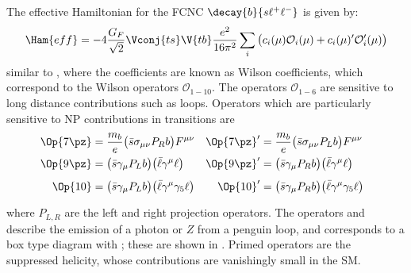 
The effective Hamiltonian for the FCNC $\decay{b}{s\ell^+\ell^-}$ is given by:
\begin{equation}
  \Ham{eff} = -4\frac{G_F}{\sqrt{2}}\Vconj{ts}\V{tb}\frac{e^2}{16\pi^2}
  \sum_{i}\big(c_i(\mu)\mathcal{O}_i(\mu)+c_i(\mu)^\prime\mathcal{O}_i^\prime(\mu)\big)
\end{equation}
similar to , where the coefficients are known as Wilson coefficients, which
correspond to the Wilson operators $\mathcal{O}_{1-10}$.
The operators $\mathcal{O}_{1-6}$ are sensitive to long distance contributions such as \ccbar
loops.
Operators which are particularly sensitive to NP contributions in  transitions are
\begin{align}
  \Op{7\pz} &= \frac{m_b}{e}\big(\bar s \sigma_{\mu\nu}P_Rb\big)F^{\mu\nu}
  &\Op{7\pz}^\prime &= \frac{m_b}{e}\big(\bar s \sigma_{\mu\nu}P_Lb\big)F^{\mu\nu}
  \nonumber\\
  \Op{9\pz} &= \big(\bar s\gamma_\mu P_Lb\big)\big(\bar\ell\gamma^\mu\ell\big)
  &\Op{9\pz}^\prime &= \big(\bar s\gamma_\mu P_Rb\big)\big(\bar\ell\gamma^\mu\ell\big)
  \nonumber\\
  \Op{10} &= \big(\bar s\gamma_\mu P_Lb\big)\big(\bar\ell\gamma^\mu\gamma_5\ell\big)
  &\Op{10}^\prime &= \big(\bar s\gamma_\mu P_Rb\big)\big(\bar\ell\gamma^\mu\gamma_5\ell\big)
  \phantom{\frac{1}{1}}
\end{align}
where $P_{L,R}$ are the left and right projection operators.
The operators  and  describe the emission of a photon or $Z$ from a penguin loop,
and  corresponds to a box type diagram with \Wp; these are shown in .
Primed operators are the suppressed helicity, whose contributions are vanishingly small in the SM.

